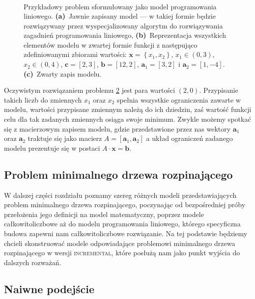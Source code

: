 \begin{figure}[!htbp]
\begin{subfigure}[b]{0.3\textwidth}
\begin{subequations}
\begin{alignat*}{4}
			\end{alignat*}
		\end{subequations}
		\caption{}
		\label{fig:lpexample:c}
	\end{subfigure}
	\hfill\null
	\caption{
		Przykładowy problem sformułowany jako model programowania liniowego.
		\textbf{(a)}~Jawnie zapisany model --- w takiej formie będzie rozwiązywany przez wyspecjalizowany algorytm do rozwiązywania zagadnień programowania liniowego,
		\textbf{(b)}~Reprezentacja wszystkich elementów modelu w zwartej formie funkcji z następująco zdefiniowanymi zbiorami wartości: $\textbf{x} = \left\{ x_{1}, x_{2} \right\}$, $x_{1} \in \left( 0, 3 \right)$, $x_{2} \in \left( 0, 4 \right)$, $\textbf{c} = \left[ 2, 3 \right]$, $\textbf{b} = \left[ 12, 2 \right]$, $\textbf{a}_{1} = \left[ 3, 2 \right]$ i $\textbf{a}_{2} = \left[ 1, -4 \right]$.
		\textbf{(c)}~Zwarty zapis modelu.
	}
	\label{lpexample}
\end{figure}

Oczywistym rozwiązaniem problemu \ref{lpexample} jest para wartości $\left( 2, 0 \right)$. Przypisanie takich liczb do zmiennych $x_{1}$ oraz $x_{2}$ spełnia wszystkie ograniczenia zawarte w modelu, wartości przypisane zmiennym należą do ich dziedzin, zaś wartość funkcji celu dla tak zadanych zmiennych osiąga swoje minimum. Zwykle możemy spotkać się z macierzowym zapisem modelu, gdzie przedstawione przez nas wektory $\textbf{a}_{1}$ oraz $\textbf{a}_{2}$ traktuje się jako macierz $A = \left[ \textbf{a}_{1}, \textbf{a}_{2} \right]$ a układ ograniczeń zadanego modelu prezentuje się w postaci $A \cdot \textbf{x} = \textbf{b}$.

\subsection{Problem minimalnego drzewa rozpinającego}

W dalszej części rozdziału poznamy szereg różnych modeli przedstawiających problem minimalnego drzewa rozpinającego, poczynając od bezpośredniej próby przełożenia jego definicji na model matematyczny, poprzez modele całkowitoliczbowe aż do modelu programowania liniowego, którego specyficzna budowa zapewni nam całkowitoliczbowe rozwiązanie. Na tej podstawie będziemy chcieli skonstruować modele odpowiadające problemowi minimalnego drzewa rozpinającego w wersji \textsc{incremental}, które posłużą nam jako punkt wyjścia do dalszych rozważań.

\subsection{Naiwne podejście}

